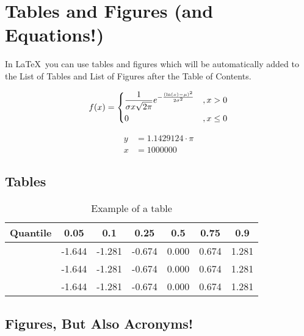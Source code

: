 \documentclass[masterthesis, english]{mas-thesis-chapters} %
\begin{document}
\section{Tables and Figures (and Equations!)}

In \LaTeX\ you can use tables and figures which will be automatically added to the List of Tables and List of Figures after the Table of Contents.

\begin{equation*}
        f(x) = 
        \begin{dcases}
            \frac{1}{\sigma x \sqrt{2 \pi}} e^{ - \frac{(\ln(x) - \mu)^2}{2 \sigma^2}} & , x > 0 \\
            0 & , x \leq 0
        \end{dcases}
\end{equation*}

\begin{align}
	y &= 1.1429124 \cdot \pi \\
	x &= 1000000
\end{align}

\subsection{Tables}

\begin{table}[ht]
\begin{center}
        \begin{tabu}{
            X
            S[table-format=-1.3]
            S[table-format=-1.3]
            S[table-format=-1.3]
            S[table-format=-1.3]
            S[table-format=-1.3]
            S[table-format=-1.3]}
            \toprule
            {Quantile} & 0.05 & 0.1 & 0.25 & 0.5 & 0.75 & 0.9 \\ 
            \midrule
             & -1.644 & -1.281 & -0.674 & 0.000 & 0.674 & 1.281 \\ 
             & -1.644 & -1.281 & -0.674 & 0.000 & 0.674 & 1.281 \\ 
             & -1.644 & -1.281 & -0.674 & 0.000 & 0.674 & 1.281 \\ 
             \bottomrule
        \end{tabu}
	\caption{Example of a table}
	\label{table:1}
\end{center}
\end{table}

\subsection{Figures, But Also Acronyms!}
\end{document}

